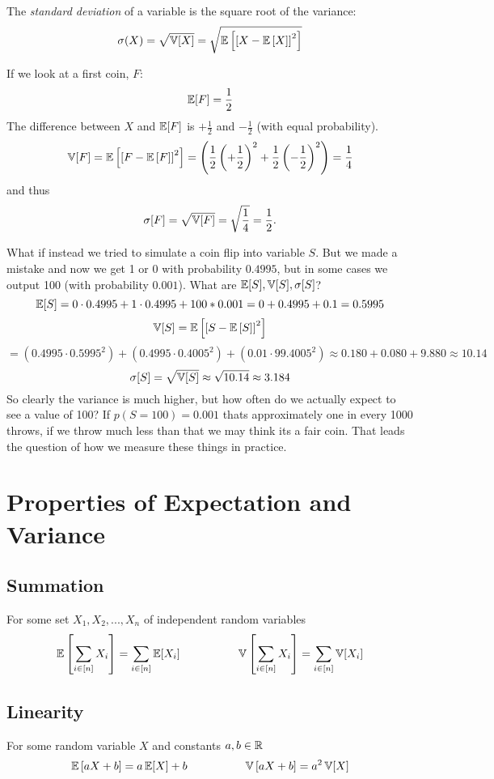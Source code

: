 The \emph{standard deviation} of a variable is the square root of the variance:
\[\sigma(X) = \sqrt{\operatorname{\mathbb{V}}[X]} = \sqrt{ \operatorname{\mathbb{E}}\left[\left[X-\operatorname{\mathbb{E}}\left[X\right]\right]^2\right]}\]

If we look at a first coin, $F$:
\[\operatorname{\mathbb{E}}[F] = \frac{1}{2}\]
The difference between $X$ and $\operatorname{\mathbb{E}}[F]$ is $+\frac{1}{2}$ and $-\frac{1}{2}$ (with equal probability). 
\[\operatorname{\mathbb{V}}[F] = \operatorname{\mathbb{E}}\left[\left[F-\operatorname{\mathbb{E}}\left[F\right]\right]^2\right] = \left(\frac{1}{2}\left(+\frac{1}{2}\right)^2 + \frac{1}{2}\left(-\frac{1}{2}\right)^2\right) = \frac{1}{4}\]
and thus
\[\sigma[F] = \sqrt{\operatorname{\mathbb{V}}[F]} = \sqrt{\frac{1}{4}} =\frac{1}{2}.\]

What if instead we tried to simulate a coin flip into variable $S$. 
But we made a mistake and now we get 1 or 0 with probability $0.4995$, but in some cases we output 100 (with probability $0.001$). 
What are $\operatorname{\mathbb{E}}[S], \operatorname{\mathbb{V}}[S], \sigma[S]$?
\[\operatorname{\mathbb{E}}[S] = 0 \cdot 0.4995 + 1 \cdot 0.4995 + 100 * 0.001 = 0 + 0.4995 + 0.1 = 0.5995\]
\[\operatorname{\mathbb{V}}[S] = \operatorname{\mathbb{E}}\left[\left[S-\operatorname{\mathbb{E}}\left[S\right]\right]^2\right] \]\[ = \left(0.4995 \cdot 0.5995^2\right) + \left(0.4995 \cdot 0.4005^2\right) + \left(0.01 \cdot  99.4005^2\right) 
\approx  0.180 + 0.080 + 9.880 \approx 10.14\]
\[\sigma[S] = \sqrt{\operatorname{\mathbb{V}}[S]} \approx \sqrt{10.14} \approx 3.184\]
So clearly the variance is much higher, but how often do we actually expect to see a value of 100? 
If $p(S=100)=0.001$ thats approximately one in every 1000 throws,
if we throw much less than that we may think its a fair coin. 
That leads the question of how we measure these things in practice. 

\section{Properties of Expectation and Variance}

\subsection{Summation}
For some set $X_1, X_2, ..., X_n$ of independent random variables
\[\operatorname{\mathbb{E}}\left[\sum_{i\in[n]} X_i\right] = \sum_{i\in[n]} \operatorname{\mathbb{E}}[X_i] \hspace{5em} 
\operatorname{\mathbb{V}}\left[\sum_{i\in[n]} X_i\right] = \sum_{i\in[n]} \operatorname{\mathbb{V}}[X_i]\]

\subsection{Linearity}
For some random variable $X$ and constants $a,b\in\operatorname{\mathbb{R}}$
\[\operatorname{\mathbb{E}}\left[aX+b\right] = a\operatorname{\mathbb{E}}[X]+b \hspace{5em} 
\operatorname{\mathbb{V}}\left[aX+b\right] = a^2\operatorname{\mathbb{V}}[X]\]

